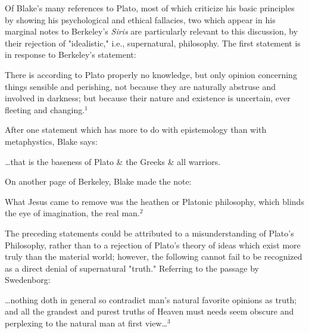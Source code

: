 Of Blake's many references to Plato, most of which criticize his basic principles by showing his psychological
and ethical fallacies, two which appear in his marginal notes to Berkeley's \textit{Siris} are particularly
relevant to this discussion, by their rejection of "idealistic," i.e., supernatural, philosophy. The first statement
is in response to Berkeley's statement:\par
\begin{center}
	\parbox{0.8\textwidth}{
		\hspace*{5mm}There is according to Plato properly no knowledge, but only opinion concerning
		things sensible and perishing, not because they are naturally abstruse and involved in
		darkness; but because their nature and existence is uncertain, ever fleeting and changing.$^{1}$\par
	}%
\end{center}
\hspace*{5mm}After one statement which has more to do with epistemology than with metaphystics, Blake says:\par
\begin{center}
	\parbox{0.8\textwidth}{
		\centering
		\hspace*{5mm}\dots that is the baseness of Plato \& the Greeks \& all warriors.\par
	}%
\end{center}
\hspace*{5mm}On another page of Berkeley, Blake made the note:\par
\begin{center}
	\parbox{0.8\textwidth}{
		\hspace*{5mm}What Jesus came to remove was the heathen or Platonic philosophy,
		which blinds the eye of imagination, the real man.$^{2}$
	}%
\end{center}
\hspace*{5mm}The preceding statements could be attributed to a misunderstanding of Plato's Philosophy, rather than to a rejection
of Plato's theory of ideas which exist more truly than the material world; however, the following cannot fail to be
recognized as a direct denial of supernatural "truth." Referring to the passage by Swedenborg:\par
\begin{center}
	\parbox{0.8\textwidth}{
		\hspace*{5mm}\dots nothing doth in general so contradict man's natural favorite
		opinions as truth; and all the grandest and purest truths of Heaven must needs seem
		obscure and perplexing to the natural man at first view\dots$^{3}$
	}%
\end{center}
